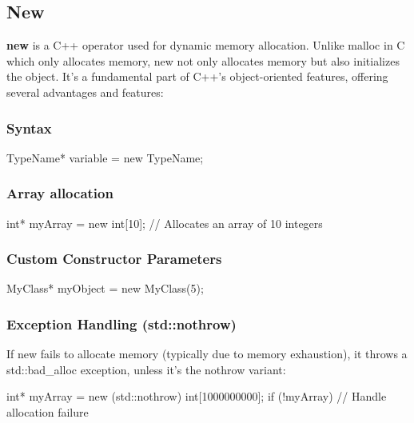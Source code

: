 \documentclass{report}
\begin{document}
    \bigbreak \noindent 
    \subsection{New}
    \bigbreak \noindent 
    \begin{concept}
        \textbf{new} is a C++ operator used for dynamic memory allocation. Unlike malloc in C which only allocates memory, new not only allocates memory but also initializes the object. It's a fundamental part of C++'s object-oriented features, offering several advantages and features:
    \end{concept}
    \bigbreak \noindent 
    \subsubsection{Syntax}
    \bigbreak \noindent 
    \begin{cppcode}
    TypeName* variable = new TypeName;
    \end{cppcode}
    \bigbreak \noindent 
    \subsubsection{Array allocation}
    \bigbreak \noindent 
    \begin{cppcode}
    int* myArray = new int[10]; // Allocates an array of 10 integers
    \end{cppcode}
    \bigbreak \noindent 
    \subsubsection{Custom Constructor Parameters}
    \bigbreak \noindent 
    \begin{cppcode}
    MyClass* myObject = new MyClass(5);
    \end{cppcode}
    \bigbreak \noindent 
    \subsubsection{Exception Handling (std::nothrow)}
    \bigbreak \noindent 
    If new fails to allocate memory (typically due to memory exhaustion), it throws a std::bad\_alloc exception, unless it's the nothrow variant:
    \bigbreak \noindent 
    \begin{cppcode}
    int* myArray = new (std::nothrow) int[1000000000];
    if (!myArray) {
        // Handle allocation failure
    }
    \end{cppcode}

    \pagebreak 
\end{document}

